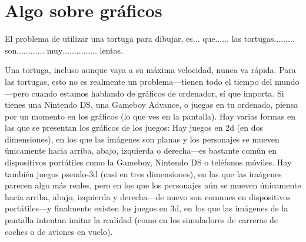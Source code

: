 

\chapter{Algo sobre gráficos}\label{ch:abitgraphic}

El problema de utilizar una tortuga para dibujar, es$\ldots$ que$\ldots$$\ldots$ las tortugas$\ldots$$\ldots$$\ldots$ son$\ldots$$\ldots$$\ldots$$\ldots$ muy$\ldots$$\ldots$$\ldots$$\ldots$$\ldots$ lentas.
\par
Una tortuga, incluso aunque vaya a su máxima velocidad, nunca va rápida.  Para las tortugas, esto no es realmente un problema---tienen todo el tiempo del mundo---pero cuando estamos hablando de gráficos de ordenador, sí que importa.  Si tienes una Nintendo DS, una Gameboy Advance, o juegas en tu ordenado, piensa por un momento en los gráficos (lo que ves en la pantalla). Hay varias formas en las que se presentan los gráficos de los juegos: Hay juegos en 2d (en dos dimensiones), en los que las imágenes son planas y los personajes se mueven únicamente hacia arriba, abajo, izquierda o derecha---es bastante común en dispositivos portátiles como la Gameboy, Nintendo DS o teléfonos móviles.  Hay también juegos pseudo-3d (casi en tres dimensiones), en las que las imágenes parecen algo más reales, pero en los que los personajes aún se mueven únicamente hacia arriba, abajo, izquierda y derecha---de nuevo son comunes en dispositivos portátiles---y finalmente existen los juegos en 3d, en los que las imágenes de la pantalla intentan imitar la realidad (como en los simuladores de carreras de coches o de aviones en vuelo).

